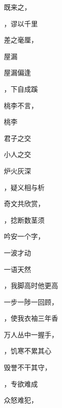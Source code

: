 \documentclass[12pt, a4paper, addpoints, answers]{exam}
\begin{document}
\begin{multicols}{2}
\begin{questions}
\question[2] 既来之，

\question[2] ，谬以千里

\question[2] 差之毫厘，

\question[2] 

\question[2] 屋漏

\question[2] 屋漏偏逢

\question[2] ，下自成蹊

\question[2] 桃李不言，

\question[2] 

\question[2] 桃李

\question[2] 

\question[2] 君子之交

\question[2] 

\question[2] 小人之交

\question[2] 

\question[2] 炉火灰深

\question[2] ，疑义相与析

\question[2] 奇文共欣赏，

\question[2] ，捻断数茎须

\question[2] 吟安一个字，

\question[2] 

\question[2] 一波才动

\question[2] 

\question[2] 一语天然

\question[2] ，我脚高时他更高

\question[2] 一步一陟一回顾，

\question[2] ，使我衣袖三年香

\question[2] 万人丛中一握手，

\question[2] ，饥寒不累其心

\question[2] 毁誉不干其守，

\question[2] ，专欲难成

\question[2] 众怒难犯，

\question[2] 


\end{questions}
\end{multicols}
\end{document}
